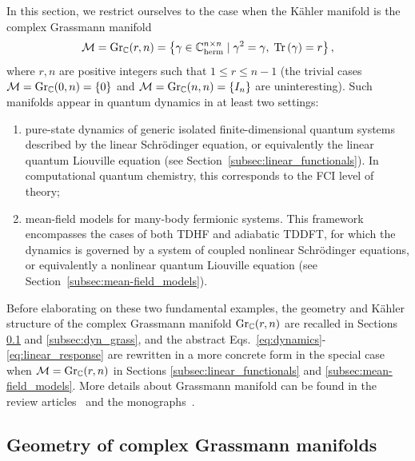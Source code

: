 \documentclass[11pt]{article}
\def\tr{{\rm Tr \,}}
\def\C{{\mathbb C}}
\begin{document}
In this section, we restrict ourselves to the case when the K\"ahler manifold is the complex Grassmann manifold 
\begin{equation}\label{eq:Grassmann_manifold}
\mathcal M= {\rm Gr}_\C(r,n) = \left\{ \gamma \in  \C^{n \times n}_{\rm herm} \; | \; \gamma^2=\gamma, \; \tr(\gamma)=r \right\},
\end{equation}
where $r,n$ are positive integers such that $1 \le   r \le n-1$ (the trivial cases $\mathcal M= {\rm Gr}_\C(0,n)=\{0\}$ and  $\mathcal M= {\rm Gr}_\C(n,n)=\{I_n\}$ are uninteresting). Such manifolds appear in quantum dynamics in at least two settings:
\begin{enumerate}
\item pure-state dynamics of generic isolated finite-dimensional quantum systems described by the linear Schr\"odinger equation, or equivalently the linear quantum Liouville equation (see Section~\ref{subsec:linear_functionals}). In computational quantum chemistry, this corresponds to the FCI level of theory;\supercite{Knowles1984,Olsen1990} 
\item mean-field models for many-body fermionic systems. This framework encompasses the cases of both TDHF \supercite{Jrgensen1970, Olsen1988,Dalgaard1982,Matsuo2001,Ebata2010,Miura2010,vanMeer2017} and adiabatic TDDFT,\supercite{Runge1984,Gross1985, Onida2002,CASIDA1995,Casida1998,Casida2005} for which the dynamics is governed by a system of coupled nonlinear Schr\"odinger equations, or equivalently a nonlinear quantum Liouville equation (see Section~\ref{subsec:mean-field_models}).
\end{enumerate}
Before elaborating on these two fundamental examples, the geometry and K\"ahler structure of the complex Grassmann manifold ${\rm Gr}_\C(r,n)$ are recalled in Sections \ref{subsec:geo_Grassmann} and \ref{subsec:dyn_grass}, and the abstract Eqs.~\eqref{eq:dynamics}-\eqref{eq:linear_response} are rewritten in a more concrete form in the special case when $\mathcal M={\rm Gr}_\C(r,n)$ in Sections \ref{subsec:linear_functionals} and \ref{subsec:mean-field_models}. More details about Grassmann manifold can be found in the review articles~\cite{bendokat2024grassmann,edelman1998geometry} and the monographs~\cite{absil2008optimization,boumal2023introduction}.


\subsection{Geometry of complex Grassmann manifolds}
\label{subsec:geo_Grassmann}
\end{document}
